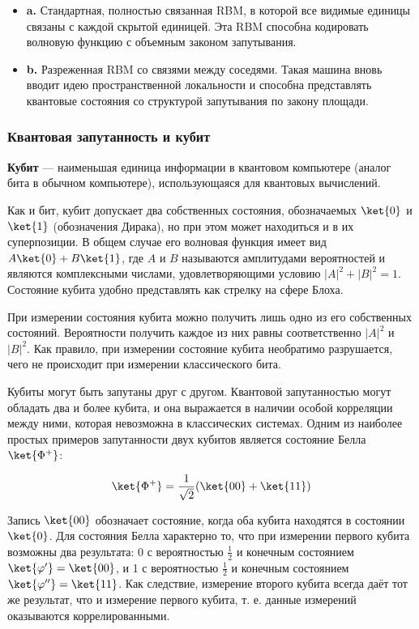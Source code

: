 \begin{itemize}
    \item \textbf{a.} Стандартная, полностью связанная RBM, в которой все видимые единицы связаны с каждой скрытой единицей. Эта RBM способна кодировать волновую функцию с объемным законом запутывания.
    \item \textbf{b.} Разреженная RBM со связями между соседями. Такая машина вновь вводит идею пространственной локальности и способна представлять квантовые состояния со структурой запутывания по закону площади.
\end{itemize}

\vspace{0.5cm}

\subsubsection{Квантовая запутанность и кубит}


\textbf{Кубит} — наименьшая единица информации в квантовом компьютере (аналог бита в обычном компьютере), использующаяся для квантовых вычислений.\cite{qubitwiki}


    Как и бит, кубит допускает два собственных состояния, обозначаемых $\ket{0}$ и $\ket{1}$ (обозначения Дирака), но при этом может находиться и в их суперпозиции. В общем случае его волновая функция имеет вид $A\ket{0} + B\ket{1}$, где $A$ и $B$ называются амплитудами вероятностей и являются комплексными числами, удовлетворяющими условию $|A|^2 + |B|^2 = 1$. Состояние кубита удобно представлять как стрелку на сфере Блоха.
    
    При измерении состояния кубита можно получить лишь одно из его собственных состояний. Вероятности получить каждое из них равны соответственно $|A|^2$ и $|B|^2$. Как правило, при измерении состояние кубита необратимо разрушается, чего не происходит при измерении классического бита.
    

    Кубиты могут быть запутаны друг с другом. Квантовой запутанностью могут обладать два и более кубита, и она выражается в наличии особой корреляции между ними, которая невозможна в классических системах. Одним из наиболее простых примеров запутанности двух кубитов является состояние Белла $\ket{\Phi^+}$:
    
    \[
    \ket{\Phi^+} = \frac{1}{\sqrt{2}} (\ket{00} + \ket{11})
    \]

    Запись $\ket{00}$ обозначает состояние, когда оба кубита находятся в состоянии $\ket{0}$. Для состояния Белла характерно то, что при измерении первого кубита возможны два результата: 0 с вероятностью $\frac{1}{2}$ и конечным состоянием $\ket{\varphi'} = \ket{00}$, и 1 с вероятностью $\frac{1}{2}$ и конечным состоянием $\ket{\varphi''} = \ket{11}$. Как следствие, измерение второго кубита всегда даёт тот же результат, что и измерение первого кубита, т. е. данные измерений оказываются коррелированными.
\vspace{0,25cm}

